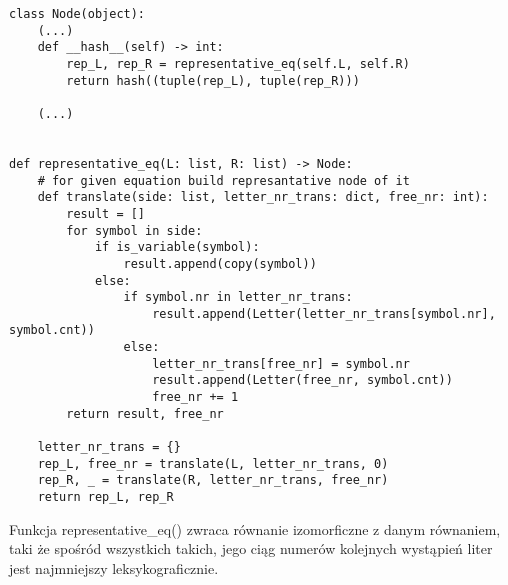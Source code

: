 \documentclass[leqno, 12pt]{article}
\begin{document}
\begin{verbatim}
class Node(object):
    (...)
    def __hash__(self) -> int:
        rep_L, rep_R = representative_eq(self.L, self.R)
        return hash((tuple(rep_L), tuple(rep_R)))

    (...)


def representative_eq(L: list, R: list) -> Node:
    # for given equation build represantative node of it
    def translate(side: list, letter_nr_trans: dict, free_nr: int):
        result = []
        for symbol in side:
            if is_variable(symbol):
                result.append(copy(symbol))
            else:
                if symbol.nr in letter_nr_trans:
                    result.append(Letter(letter_nr_trans[symbol.nr], symbol.cnt))
                else:
                    letter_nr_trans[free_nr] = symbol.nr
                    result.append(Letter(free_nr, symbol.cnt))
                    free_nr += 1
        return result, free_nr

    letter_nr_trans = {}
    rep_L, free_nr = translate(L, letter_nr_trans, 0)
    rep_R, _ = translate(R, letter_nr_trans, free_nr)
    return rep_L, rep_R
\end{verbatim}

Funkcja representative\_eq() zwraca równanie izomorficzne z danym równaniem, taki że spośród wszystkich takich, jego ciąg numerów kolejnych wystąpień liter jest najmniejszy leksykograficznie. 
\end{document}
